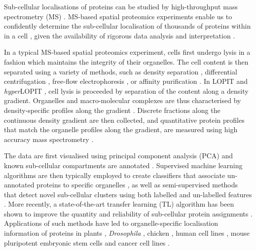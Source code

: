 \documentclass[12pt,english]{article}\usepackage[]{graphicx}\usepackage[]{color}
\begin{document}
Sub-cellular localisations of proteins
can be studied by high-throughput mass spectrometry (MS)
\citep{Gatto:2010}. MS-based spatial proteomics experiments enable us
to confidently determine the sub-cellular localisation of thousands of
proteins within in a cell \citep{hyper}, given the availability of
rigorous data analysis and interpretation \citep{Gatto:2010}.

In a typical MS-based spatial proteomics experiment, cells first
undergo lysis in a fashion which maintains the integrity of their
organelles. The cell content is then separated using a variety of
methods, such as density separation \citep{Dunkley:2006,hyper},
differential centrifugation \citep{Itzhak:2016}, free-flow
electrophoresis \citep{Parsons:2014}, or affinity purification
\citep{Heard:2015}. In LOPIT \citep{Dunkley:2004, Dunkley:2006,
  Sadowski:2006} and \textit{hyper}LOPIT \citep{hyper,Mulvey:2017}, cell
lysis is proceeded by separation of the content along a density
gradient. Organelles and macro-molecular complexes are thus
characterised by density-specific profiles along the gradient
\citep{DeDuve:1981}.  Discrete fractions along the continuous density
gradient are then collected, and quantitative protein profiles that
match the organelle profiles along the gradient, are measured using
high accuracy mass spectrometry \citep{Mulvey:2017}.

The data are first visualised using principal component analysis (PCA)
and known sub-cellular compartments are annotated
\citep{ghrepo}. Supervised machine learning algorithms are then
typically employed to create classifiers that associate un-annotated
proteins to specific organelles \citep{Gatto:2014b}, as well as
semi-supervised methods that detect novel sub-cellular clusters using
both labelled and un-labelled features \citep{Breckels:2013}. More
recently, a state-of-the-art transfer learning (TL) algorithm has been
shown to improve the quantity and reliability of sub-cellular protein
assignments \citep{Breckels:2016}. Applications of such methods have
led to organelle-specific localisation information of proteins in
plants \citep{Dunkley:2006}, \textit{Drosophila} \citep{Tan:2009},
chicken \citep{hall:2009}, human cell lines \citep{Breckels:2013},
mouse pluripotent embryonic stem cells \citep{hyper} and cancer cell
lines \citep{Thul:2017}.
\end{document}
